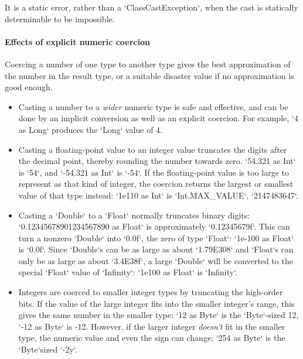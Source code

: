 {It is a static error, rather than a 
\xcd`ClassCastException`, when the cast is statically determinable to be
impossible.}



\paragraph{Effects of explicit numeric coercion}
\label{sec:effects-of-explicit-numeric-coercions}

Coercing a number of one type to another type gives the best approximation of
the number in the result type, or a suitable disaster value if no
approximation is good enough.  

\begin{itemize}
\item Casting a number to a {\em wider} numeric type is safe and effective,
      and can be done by an implicit conversion as well as an explicit
      coercion.  For example, \xcd`4 as Long` produces the \xcd`Long` value of
      4. 
\item Casting a floating-point value to an integer value truncates the digits
      after the decimal point, thereby rounding the number towards zero.  
      \xcd`54.321 as Int` is \xcd`54`, and 
      \xcd`-54.321 as Int` is \xcd`-54`.
      If the floating-point value is too large to represent as that kind of
      integer, the coercion returns the largest or smallest value of that type
      instead: \xcd`1e110 as Int` is 
      \xcd`Int.MAX_VALUE`, \viz{} \xcd`2147483647`. 

\item Casting a \xcd`Double` to a \xcd`Float` normally truncates binary digits: \\
      \xcd`0.12345678901234567890 as Float` is approximately \xcd`0.12345679f`.  This can
      turn a nonzero \xcd`Double` into \xcd`0.0f`, the zero of type
      \xcd`Float`: 
      \xcd`1e-100 as Float` is \xcd`0.0f`.  Since 
      \xcd`Double`s can be as large as about \xcd`1.79E308` and \xcd`Float`s
      can only be as large as about \xcd`3.4E38f`, a large \xcd`Double` will
      be converted to the special \xcd`Float` value of \xcd`Infinity`: 
      \xcd`1e100 as Float` is \xcd`Infinity`.
\item Integers are coerced to smaller integer types by truncating the
      high-order bits. If the value of the large integer fits into the smaller
      integer's range, this gives the same number in the smaller type: 
      \xcd`12 as Byte` is the \xcd`Byte`-sized 12, 
      \xcd`-12 as Byte` is -12. 
      However, if the larger integer {\em doesn't} fit in the smaller type,
      the numeric value and even the sign can change: \xcd`254 as Byte` is
      the \xcd`Byte`sized \xcd`-2y`.  


\end{itemize}
